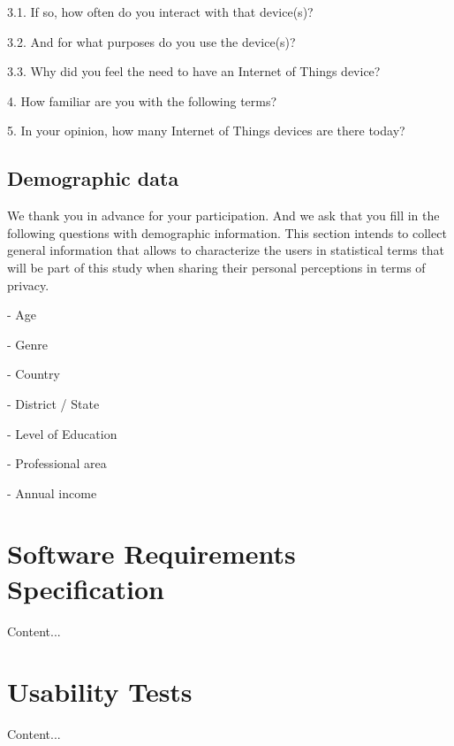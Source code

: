 3.1. If so, how often do you interact with that device(s)?

3.2. And for what purposes do you use the device(s)?

3.3. Why did you feel the need to have an Internet of Things device?

4. How familiar are you with the following terms?

5. In your opinion, how many Internet of Things devices are there today?

\subsection*{Demographic data}

We thank you in advance for your participation. And we ask that you fill in
the following questions with demographic information. This section intends
to collect general information that allows to characterize the users in
statistical terms that will be part of this study when sharing their personal
perceptions in terms of privacy.

- Age

- Genre

- Country

- District / State

- Level of Education

- Professional area

- Annual income



\section*{Software Requirements Specification}
\label{appendix:a}

Content...

\section*{Usability Tests}
\label{appendix:usability_tests}

Content...
